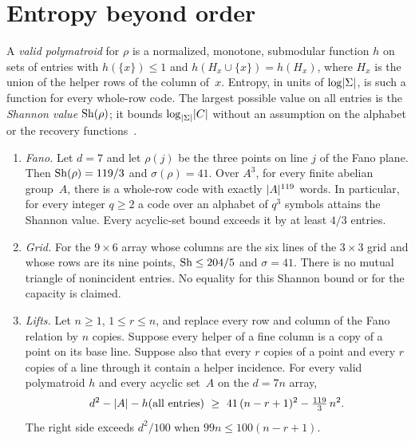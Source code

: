 \section{Entropy beyond order}\label{sec:entropy}

A \emph{valid polymatroid} for $\rho$ is a normalized, monotone, submodular function $h$ on sets of entries with
$h(\{x\})\le1$ and $h(H_x\cup\{x\})=h(H_x)$, where $H_x$ is the union of the helper rows of the column of~$x$.
Entropy, in units of $\log\lvert \Sigma \rvert$, is such a function for every whole-row code. The largest possible value on
all entries is the \emph{Shannon value} $\mathrm{Sh}(\rho)$; it bounds $\log_{\lvert \Sigma \rvert}\lvert C \rvert$ without an assumption on
the alphabet or the recovery functions~\cite[Theorem~6.3]{FourthPaper2026}.

\begin{theorem}\label{thm:E}
\begin{enumerate}[label=(\alph*),leftmargin=2em]
\item \emph{Fano.} Let $d=7$ and let $\rho(j)$ be the three points on line $j$ of the Fano plane. Then
$\mathrm{Sh}(\rho)=119/3$ and $\sigma(\rho)=41$. Over $A^3$, for every finite abelian group~$A$, there is a whole-row
code with exactly $\lvert A \rvert^{119}$ words. In particular, for every integer $q\ge2$ a code over an alphabet of $q^3$
symbols attains the Shannon value. Every acyclic-set bound exceeds it by at least $4/3$ entries.
\item \emph{Grid.} For the $9\times6$ array whose columns are the six lines of the $3\times3$ grid and whose rows are
its nine points, $\mathrm{Sh}\le204/5$ and $\sigma=41$. There is no mutual triangle of nonincident entries. No equality
for this Shannon bound or for the capacity is claimed.
\item \emph{Lifts.} Let $n\ge1$, $1\le r\le n$, and replace every row and column of the Fano relation by $n$ copies.
Suppose every helper of a fine column is a copy of a point on its base line. Suppose also that every $r$ copies of
a point and every $r$ copies of a line through it contain a helper incidence. For every valid polymatroid $h$ and
every acyclic set~$A$ on the $d=7n$ array,
\[
  d^2-\card A-h(\text{all entries})\ \ge\ 41\,(n-r+1)^2-\tfrac{119}{3}\,n^2 .
\]
The right side exceeds $d^2/100$ when $99n\le100(n-r+1)$.
\end{enumerate}
\end{theorem}

